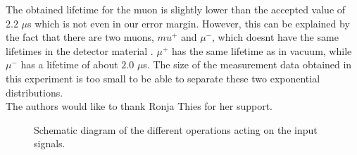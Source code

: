 \documentclass[10pt,twocolumn]{article}
\begin{document}
The obtained lifetime for the muon is slightly lower than the accepted value of $2.2$ $\mu$s which is not even in our error margin. However, this can be explained by the fact that there are two muons, $mu^+$ and $\mu^-$, which doesnt have the same lifetimes in the detector material \cite{}. $\mu^+$ has the same lifetime as in vacuum, while $\mu^-$ has a lifetime of about $2.0$ $\mu$s. The size of the measurement data obtained in this experiment is too small to be able to separate these two exponential distributions.
\\

The authors would like to thank Ronja Thies for her support.


\begin{figure}[h]

\caption{\label{setup} Schematic diagram of the different operations acting on the input signals.}
\end{figure}


\end{document}
